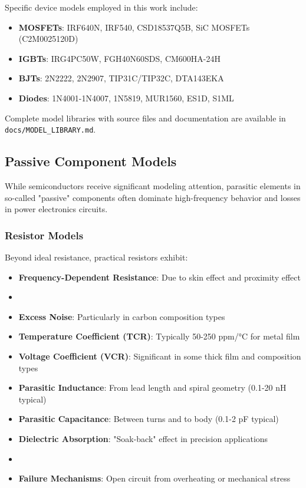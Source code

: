 Specific device models employed in this work include:
\begin{itemize}
    \item \textbf{MOSFETs}: IRF640N, IRF540, CSD18537Q5B, SiC MOSFETs (C2M0025120D)
    \item \textbf{IGBTs}: IRG4PC50W, FGH40N60SDS, CM600HA-24H
    \item \textbf{BJTs}: 2N2222, 2N2907, TIP31C/TIP32C, DTA143EKA
    \item \textbf{Diodes}: 1N4001-1N4007, 1N5819, MUR1560, ES1D, S1ML
\end{itemize}

Complete model libraries with source files and documentation are available in \texttt{docs/MODEL\_LIBRARY.md}.

\subsection{Passive Component Models}
While semiconductors receive significant modeling attention, parasitic elements in so-called "passive" components often dominate high-frequency behavior and losses in power electronics circuits.

\subsubsection{Resistor Models}
Beyond ideal resistance, practical resistors exhibit:
\begin{itemize}
    \item \textbf{Frequency-Dependent Resistance}: Due to skin effect and proximity effect
    \item \item \textbf{Excess Noise}: Particularly in carbon composition types
    \item \textbf{Temperature Coefficient (TCR)}: Typically 50-250 ppm/°C for metal film
    \item \textbf{Voltage Coefficient (VCR)}: Significant in some thick film and composition types
    \item \textbf{Parasitic Inductance}: From lead length and spiral geometry (0.1-20 nH typical)
    \item \textbf{Parasitic Capacitance}: Between turns and to body (0.1-2 pF typical)
    \item \textbf{Dielectric Absorption}: "Soak-back" effect in precision applications
    \item \item \textbf{Failure Mechanisms}: Open circuit from overheating or mechanical stress
\end{itemize}


